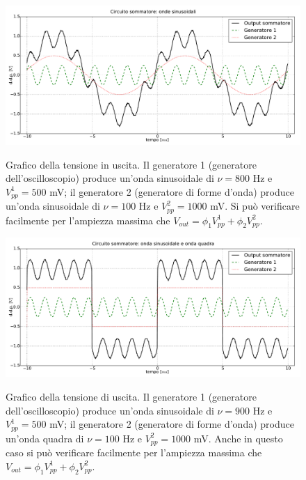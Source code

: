 \begin{figure}[ht]
 \centering
   {\includegraphics[width=14.8cm]{../E01/latex/sinsin.pdf}}
 \caption{Grafico della tensione in uscita. Il generatore 1 (generatore dell'oscilloscopio) produce un'onda sinusoidale di $\nu=800$ \si{\hertz} e $V^1_{pp}=500$ \si{\milli\volt}; il generatore 2 (generatore di forme d'onda) produce un'onda sinusoidale di $\nu=100$ \si{\hertz} e $V^2_{pp}=1000$ \si{\milli\volt}. Si può verificare facilmente per l'ampiezza massima che $V_{out} = \phi_1 V^1_{pp}+\phi_2 V^2_{pp}$.}
 \label{gr1:onde1}
\end{figure}

\begin{figure}[ht]
 \centering
   {\includegraphics[width=14.8cm]{../E01/latex/sinquad.pdf}}
 \caption{Grafico della tensione di uscita. Il generatore 1 (generatore dell'oscilloscopio) produce un'onda sinusoidale di $\nu=900$ \si{\hertz} e $V^1_{pp}=500$ \si{\milli\volt}; il generatore 2 (generatore di forme d'onda) produce un'onda quadra di $\nu=100$ \si{\hertz} e $V^2_{pp}=1000$ \si{\milli\volt}. Anche in questo caso si può verificare facilmente per l'ampiezza massima che $V_{out} = \phi_1 V^1_{pp}+\phi_2 V^2_{pp}$.}
 \label{gr1:onde2}
\end{figure}

